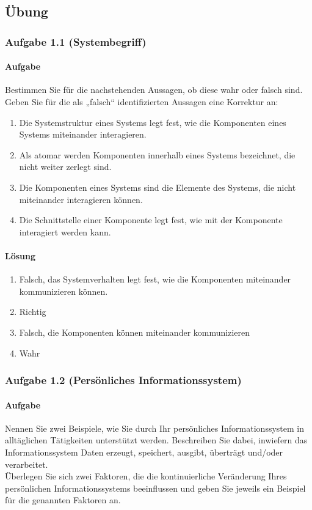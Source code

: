 \subsection{Übung}

\subsubsection*{Aufgabe 1.1 (Systembegriff)}
\paragraph*{Aufgabe}
    Bestimmen Sie für die nachstehenden Aussagen, ob diese wahr oder falsch sind. Geben Sie für die als „falsch“ identifizierten Aussagen eine Korrektur an:
    \begin{enumerate}[label=\alph*)]
        \item Die Systemstruktur eines Systems legt fest, wie die Komponenten eines Systems miteinander interagieren.
        \item Als atomar werden Komponenten innerhalb eines Systems bezeichnet, die nicht weiter zerlegt sind.
        \item Die Komponenten eines Systems sind die Elemente des Systems, die nicht miteinander interagieren können.
        \item Die Schnittstelle einer Komponente legt fest, wie mit der Komponente interagiert werden kann.
    \end{enumerate}
\paragraph*{Lösung}
    \begin{enumerate}[label=\alph*)]
        \item Falsch, das Systemverhalten legt fest, wie die Komponenten miteinander kommunizieren können.
        \item Richtig
        \item Falsch, die Komponenten können miteinander kommunizieren
        \item Wahr
    \end{enumerate}

\subsubsection*{Aufgabe 1.2 (Persönliches Informationssystem)}
\paragraph*{Aufgabe}
    Nennen Sie zwei Beispiele, wie Sie durch Ihr persönliches Informationssystem in alltäglichen Tätigkeiten unterstützt werden. Beschreiben Sie dabei, inwiefern das Informationssystem Daten erzeugt, speichert, ausgibt, überträgt und/oder verarbeitet. \\
    Überlegen Sie sich zwei Faktoren, die die kontinuierliche Veränderung Ihres persönlichen Informationssystems beeinflussen und geben Sie jeweils ein Beispiel für die genannten Faktoren an.
